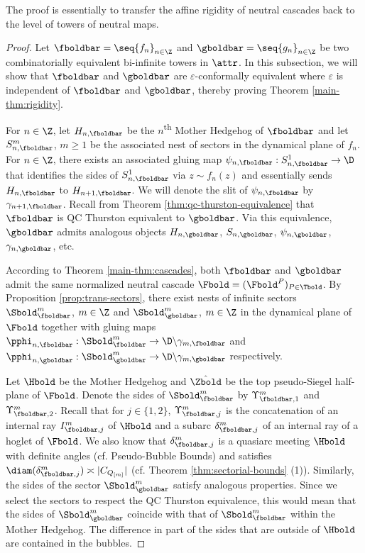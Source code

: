 \documentclass{amsart}
\begin{document}
The proof is essentially to transfer the affine rigidity of neutral cascades back to the level of towers of neutral maps.

\begin{proof}
    Let $\fboldbar = \seq{f_n}_{n\in\Z}$ and $\gboldbar = \seq{g_n}_{n\in\Z}$ be two combinatorially equivalent bi-infinite towers in $\attr$.
    In this subsection, we will show that $\fboldbar$ and $\gboldbar$ are $\varepsilon$-conformally equivalent where $\varepsilon$ is independent of $\fboldbar$ and $\gboldbar$, thereby proving Theorem \ref{main-thm:rigidity}.

    For $n \in \Z$, let $H_{n,\fboldbar}$ be the $n$\textsuperscript{th} Mother Hedgehog of $\fboldbar$ and let $S_{n,\fboldbar}^m$, $m \geq 1$ be the associated nest of sectors in the dynamical plane of $f_n$.
    For $n \in \Z$, there exists an associated gluing map $\psi_{n,\fboldbar} : S_{n,\fboldbar}^1 \to \D$ that identifies the sides of $S_{n,\fboldbar}^1$ via $z \sim f_n(z)$ and essentially sends $H_{n,\fboldbar}$ to $H_{n+1,\fboldbar}$.
    We will denote the slit of $\psi_{n,\fboldbar}$ by $\gamma_{n+1, \fboldbar}$.
    Recall from Theorem \ref{thm:qc-thurston-equivalence} that $\fboldbar$ is QC Thurston equivalent to $\gboldbar$.
    Via this equivalence, $\gboldbar$ admits analogous objects $H_{n,\gboldbar}$, $S_{n,\gboldbar}$, $\psi_{n,\gboldbar}$, $\gamma_{n,\gboldbar}$, etc.

    According to Theorem \ref{main-thm:cascades}, both $\fboldbar$ and $\gboldbar$ admit the same normalized neutral cascade $\Fbold = (\Fbold^P)_{P \in \Tbold}$.
    By Proposition \ref{prop:trans-sectors}, there exist nests of infinite sectors $\Sbold_{\fboldbar}^m$, $m \in \Z$ and $\Sbold_{\gboldbar}^m$, $m \in \Z$ in the dynamical plane of $\Fbold$ together with gluing maps $\pphi_{n,\fboldbar} : \Sbold_{\fboldbar}^m \to \D \backslash \gamma_{m, \fboldbar}$ and $\pphi_{n,\gboldbar} : \Sbold_{\gboldbar}^m \to \D \backslash \gamma_{m, \gboldbar}$ respectively.

    Let $\Hbold$ be the Mother Hedgehog and $\hat{\Zbold}$ be the top pseudo-Siegel half-plane of $\Fbold$.
    Denote the sides of $\Sbold^m_{\fboldbar}$ by $\Upsilon^m_{\fboldbar,1}$ and $\Upsilon^m_{\fboldbar,2}$.
    Recall that for $j \in \{1,2\}$, $\Upsilon^m_{\fboldbar,j}$ is the concatenation of an internal ray $I^m_{\fboldbar,j}$ of $\Hbold$ and a subarc $\delta^m_{\fboldbar,j}$ of an internal ray of a hoglet of $\Fbold$.
    We also know that $\delta^m_{\fboldbar,j}$ is a quasiarc meeting $\Hbold$ with definite angles (cf. Pseudo-Bubble Bounds) and satisfies $\diam(\delta^m_{\fboldbar,j}) \asymp |C_{Q_{[m]}}|$ (cf. Theorem \ref{thm:sectorial-bounds} (1)).
    Similarly, the sides of the sector $\Sbold_{\gboldbar}^m$ satisfy analogous properties.
    Since we select the sectors to respect the QC Thurston equivalence, this would mean that the sides of $\Sbold_{\gboldbar}^m$ coincide with that of $\Sbold_{\fboldbar}^m$ within the Mother Hedgehog.
    The difference in part of the sides that are outside of $\Hbold$ are contained in the bubbles.
    

\end{proof}
\end{document}
